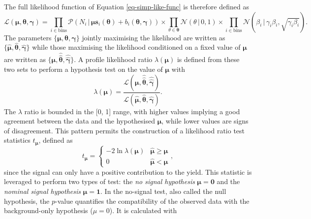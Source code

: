The full likelihood function of Equation \ref{eq-simp-like-func} is therefore defined as
\begin{equation}
\mathcal{L}\left(\boldsymbol{\mu}, \boldsymbol{\theta}, \boldsymbol{\gamma}\right) = \prod_{i\in \textrm{bins}} \mathcal{P}(N_i \,|\, \boldsymbol{\mu} \boldsymbol{s}_i(\boldsymbol{\theta}) + b_i(\boldsymbol{\theta}, \boldsymbol{\gamma})) \times  \prod_{\theta \in \boldsymbol{\theta}} \mathcal{N}(\theta \,|\, 0, 1) \times \prod_{i \in \textrm{bins}} \mathcal{N}(\beta_i \,|\, \gamma_i \beta_i, \sqrt{\gamma_i \beta_i}).
\end{equation}
The parameters $\{\boldsymbol{\mu}, \boldsymbol{\theta}, \boldsymbol{\gamma}\}$ jointly maximising the likelihood are written as $\{\hat{\boldsymbol{\mu}}, \hat{\boldsymbol{\theta}}, \hat{\boldsymbol{\gamma}}\}$ while those maximising the likelihood conditioned on a fixed value of $\boldsymbol{\mu}$ are written as $\{\boldsymbol{\mu}, \hat{\hat{\boldsymbol{\theta}}}, \hat{\hat{\boldsymbol{\gamma}}}\}$. A profile likelihood ratio $\lambda(\boldsymbol{\mu})$  is defined from these two sets to perform a hypothesis test on the value of $\boldsymbol{\mu}$ with
\begin{equation}\label{eq-lik-ratio}
    \lambda(\boldsymbol{\mu}) = \frac{\mathcal{L}\left(\boldsymbol{\mu}, \hat{\hat{\boldsymbol{\theta}}}, \hat{\hat{\boldsymbol{\gamma}}} \right)}{\mathcal{L}\left(\hat{\boldsymbol{\mu}}, \hat{\boldsymbol{\theta}}, \hat{\boldsymbol{\gamma}} \right)}.
\end{equation}
The $\lambda$ ratio is bounded in the [0, 1] range, with higher values implying a good agreement between the data and the hypothesised $\boldsymbol{\mu}$, while lower values are signs of disagreement. This pattern permits the construction of a likelihood ratio test statistics $t_{\boldsymbol{\mu}}$, defined as \cite{asympForm}
\begin{equation}\label{eq-lik-ratio-test}
    t_{\boldsymbol{\mu}} =
      \begin{cases}
        -2 \ln \lambda(\boldsymbol{\mu}) & \hat{\boldsymbol{\mu}} \geq \boldsymbol{\mu} \\
        0 & \hat{\boldsymbol{\mu}} < \boldsymbol{\mu}
      \end{cases},
\end{equation}
since the signal can only have a positive contribution to the yield. This statistic is leveraged to perform two types of test: the \textit{no signal hypothesis} $\boldsymbol{\mu} = \boldsymbol{0}$ and the \textit{nominal signal hypothesis} $\boldsymbol{\mu} = \boldsymbol{1}$. In the no-signal test, also called the null hypothesis, the $p$-value quantifies the compatibility of the observed data with the background-only hypothesis ($\mu = 0$). It is calculated with
